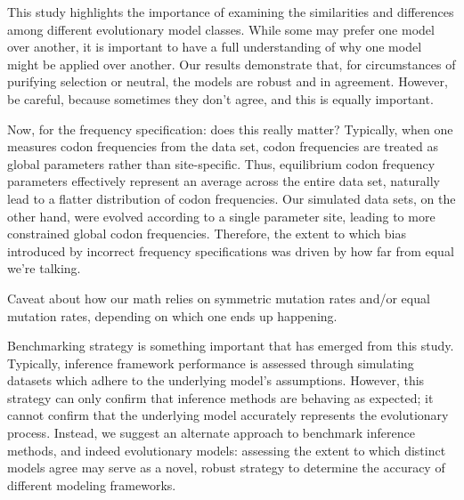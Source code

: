 \documentclass[11pt]{article}
\begin{document}
This study highlights the importance of examining the similarities and differences among different evolutionary model classes. While some may prefer one model over another, it is important to have a full understanding of why one model might be applied over another. Our results demonstrate that, for circumstances of purifying selection or neutral, the models are robust and in agreement. However, be careful, because sometimes they don't agree, and this is equally important.


Now, for the frequency specification: does this really matter? Typically, when one measures codon frequencies from the data set, codon frequencies are treated as global parameters rather than site-specific. Thus, equilibrium codon frequency parameters effectively represent an average across the entire data set, naturally lead to a flatter distribution of codon frequencies. Our simulated data sets, on the other hand, were evolved according to a single parameter site, leading to more constrained global codon frequencies. Therefore, the extent to which bias introduced by incorrect frequency specifications was driven by how far from equal we're talking.


Caveat about how our math relies on symmetric mutation rates and/or equal mutation rates, depending on which one ends up happening.
	
Benchmarking strategy is something important that has emerged from this study. 
Typically, inference framework performance is assessed through simulating datasets which adhere to the underlying model's assumptions. However, this strategy can only confirm that inference methods are behaving as expected; it cannot confirm that the underlying model accurately represents the evolutionary process. Instead, we suggest an alternate approach to benchmark inference methods, and indeed evolutionary models: assessing the extent to which distinct models agree may serve as a novel, robust strategy to determine the accuracy of different modeling frameworks.











\end{document}
